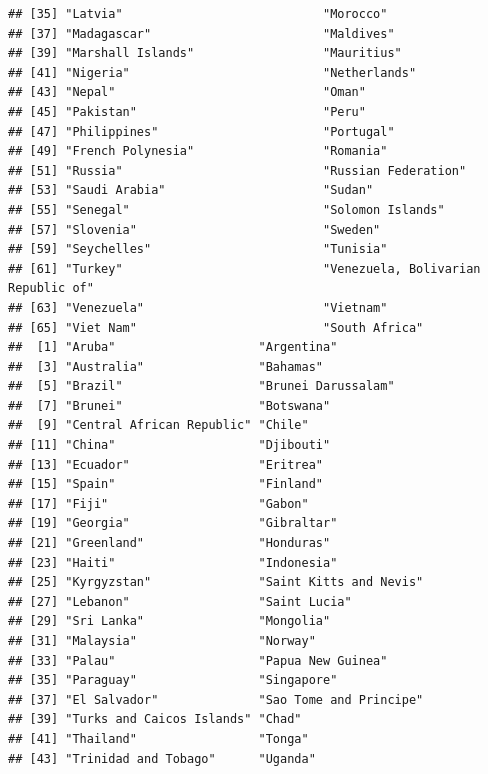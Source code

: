 \documentclass[]{article}
\begin{document}
\begin{verbatim}
## [35] "Latvia"                            "Morocco"                          
## [37] "Madagascar"                        "Maldives"                         
## [39] "Marshall Islands"                  "Mauritius"                        
## [41] "Nigeria"                           "Netherlands"                      
## [43] "Nepal"                             "Oman"                             
## [45] "Pakistan"                          "Peru"                             
## [47] "Philippines"                       "Portugal"                         
## [49] "French Polynesia"                  "Romania"                          
## [51] "Russia"                            "Russian Federation"               
## [53] "Saudi Arabia"                      "Sudan"                            
## [55] "Senegal"                           "Solomon Islands"                  
## [57] "Slovenia"                          "Sweden"                           
## [59] "Seychelles"                        "Tunisia"                          
## [61] "Turkey"                            "Venezuela, Bolivarian Republic of"
## [63] "Venezuela"                         "Vietnam"                          
## [65] "Viet Nam"                          "South Africa"                     
##  [1] "Aruba"                    "Argentina"               
##  [3] "Australia"                "Bahamas"                 
##  [5] "Brazil"                   "Brunei Darussalam"       
##  [7] "Brunei"                   "Botswana"                
##  [9] "Central African Republic" "Chile"                   
## [11] "China"                    "Djibouti"                
## [13] "Ecuador"                  "Eritrea"                 
## [15] "Spain"                    "Finland"                 
## [17] "Fiji"                     "Gabon"                   
## [19] "Georgia"                  "Gibraltar"               
## [21] "Greenland"                "Honduras"                
## [23] "Haiti"                    "Indonesia"               
## [25] "Kyrgyzstan"               "Saint Kitts and Nevis"   
## [27] "Lebanon"                  "Saint Lucia"             
## [29] "Sri Lanka"                "Mongolia"                
## [31] "Malaysia"                 "Norway"                  
## [33] "Palau"                    "Papua New Guinea"        
## [35] "Paraguay"                 "Singapore"               
## [37] "El Salvador"              "Sao Tome and Principe"   
## [39] "Turks and Caicos Islands" "Chad"                    
## [41] "Thailand"                 "Tonga"                   
## [43] "Trinidad and Tobago"      "Uganda"                  

\end{verbatim}
\end{document}
